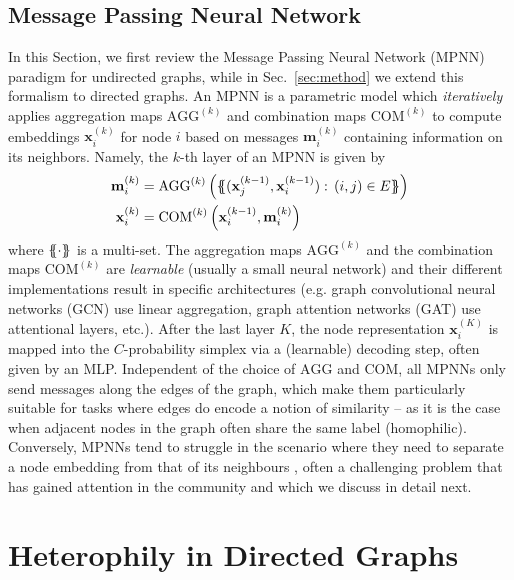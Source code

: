 \documentclass{article}
\newcommand\m{m}
\newcommand\nclass{C}
\newcommand\ilayer{k}
\newcommand\nlayers{K}
\newcommand*{\ldblbrace}{\{\mskip-6mu\{}
\newcommand*{\rdblbrace}{\}\mskip-6mu\}}
\theoremstyle{plain}
\theoremstyle{definition}
\theoremstyle{remark}
\begin{document}
\subsection{Message Passing Neural Network}
In this Section, we first review the Message Passing Neural Network (MPNN) paradigm for undirected graphs, while in Sec.~\ref{sec:method} we extend this formalism to directed graphs. An MPNN is a parametric model which \emph{iteratively} applies  aggregation maps $\mathrm{AGG}^{(k)}$ and combination maps $\mathrm{COM}^{(k)}$ to compute embeddings $\mathbf{x}_{i}^{(k)}$ for node $i$ based on messages $\mathbf{m}^{(k)}_{i}$ containing information on its neighbors. Namely, the $k$-th layer of an MPNN is given by
\begin{align}
\begin{split}
\mathbf{\m}^{(\ilayer)}_{i} &=  \mathrm{AGG}^{(\ilayer)}\left(\ldblbrace (\mathbf{x}_{j}^{(\ilayer-1)}, \mathbf{x}_{i}^{(\ilayer-1)}):\, (i,j)\in E \rdblbrace\right) \\
\mathbf{x}_{i}^{(\ilayer)}   &=  \mathrm{COM}^{(\ilayer)}\left(\mathbf{x}_i^{(\ilayer-1)}, \mathbf{\m}^{(\ilayer)}_i\right) \label{eq:mpnn}
\end{split}
\end{align}
\noindent where $\ldblbrace\cdot\rdblbrace$ is a multi-set.
The aggregation maps $\mathrm{AGG}^{(k)}$ and the combination maps $\mathrm{COM}^{(k)}$ are {\em learnable} (usually a small neural network) and their different implementations  result in specific architectures (e.g.  graph convolutional neural networks (GCN) use linear aggregation, graph attention networks (GAT) use attentional layers, etc.). After the last layer $\nlayers$, the node representation $\mathbf{x}_i^{(\nlayers)}$ is mapped into the $\nclass$-probability simplex via a (learnable) decoding step, often given by an MLP. Independent of the choice of $\mathrm{AGG}$ and $\mathrm{COM}$, all MPNNs only send messages along the edges of the graph, which make them particularly suitable for tasks where edges do encode a notion of similarity -- as it is the case when adjacent nodes in the graph often share the same label (homophilic). Conversely, MPNNs tend to struggle in the scenario where they need to separate 
a node embedding from that of its neighbours \cite{nt2019revisiting}, often a challenging problem that has gained attention in the community and which we discuss in detail next.

 \section{Heterophily in Directed Graphs}
\label{sec:directed_heterophily}
\end{document}
